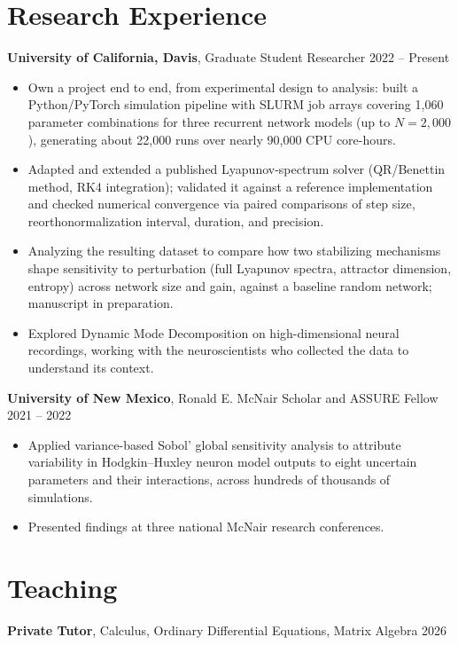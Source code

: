 \documentclass[10pt,letterpaper]{article}
\newcommand{\entry}[2]{%
  \noindent#1\hfill
  {\fontsize{9.8}{12}\selectfont\color{muted}#2}\par
}
\newcommand{\gap}{\vspace{4pt}}
\begin{document}
\section*{Research Experience}

\entry{\textbf{University of California, Davis}, Graduate Student Researcher}
{2022 -- Present}
\begin{itemize}
  \item Own a project end to end, from experimental design to analysis: built a Python/PyTorch simulation pipeline with SLURM job arrays covering 1,060 parameter combinations for three recurrent network models (up to $N=2{,}000$), generating about 22,000 runs over nearly 90,000 CPU core-hours.
  \item Adapted and extended a published Lyapunov-spectrum solver (QR/Benettin method, RK4 integration); validated it against a reference implementation and checked numerical convergence via paired comparisons of step size, reorthonormalization interval, duration, and precision.
  \item Analyzing the resulting dataset to compare how two stabilizing mechanisms shape sensitivity to perturbation (full Lyapunov spectra, attractor dimension, entropy) across network size and gain, against a baseline random network; manuscript in preparation.
  \item Explored Dynamic Mode Decomposition on high-dimensional neural recordings, working with the neuroscientists who collected the data to understand its context.
\end{itemize}

\gap
\entry{\textbf{University of New Mexico}, Ronald E. McNair Scholar and ASSURE Fellow}
{2021 -- 2022}
\begin{itemize}
  \item Applied variance-based Sobol' global sensitivity analysis to attribute variability in Hodgkin--Huxley neuron model outputs to eight uncertain parameters and their interactions, across hundreds of thousands of simulations.
  \item Presented findings at three national McNair research conferences.
\end{itemize}

\section*{Teaching}

\entry{\textbf{Private Tutor}, Calculus, Ordinary Differential Equations, Matrix Algebra}
{2026}
\end{document}
